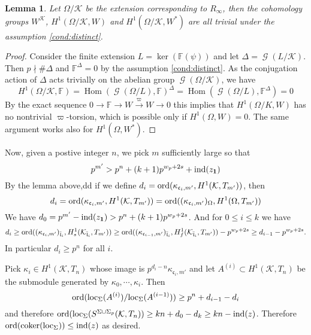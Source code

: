 \documentclass[leqno]{amsart}
\newtheorem{lem}[thm]{Lemma}
\theoremstyle{definition}
\theoremstyle{remark}
\newcommand{\id}{\mathbf{1}}
\newcommand{\fF}{\mathbb{F}} %
\DeclareMathOperator{\Hom}{Hom}
\DeclareMathOperator{\coker}{coker}
\DeclareMathOperator{\Gal}{\mathcal{G}}
\newcommand{\fc}{\mathfrak{c}}
\newcommand{\fl}{\mathfrak{l}}
\newcommand{\K}{{\mathcal{K}}} %
\newcommand{\flw}{\bar{\fl}}
\newcommand{\ord}{\textnormal{ord}} %
\begin{document}
\begin{lem}
	Let $\Omega/\K$ be the extension corresponding
	to $R_{\infty}$, then the cohomology groups
	$W^\K$, $H^1(\Omega/\K, W)$ and $H^1(\Omega/\K, W^*)$ 
	are all trivial under the assumption \eqref{cond:distinct}.
\end{lem}
\begin{proof}
	Consider the finite extension $L=\ker(\fF(\psi))$
	and let $\Delta=\Gal(L/\K)$.
	Then  $p\nmid \#\Delta$ 
	and $\fF^\Delta=0$ by the assumption  \ref{cond:distinct}.
	As the conjugation action of $\Delta$ acts trivially
	on the abelian group $\Gal(\Omega/\K)$, we have
	\[
		H^1(\Omega/\K,\fF)=
		\Hom(\Gal(\Omega/L),\fF)^\Delta=
		\Hom(\Gal(\Omega/L),\fF^\Delta)=0
	\]
	By the exact sequence
	$0\to\fF\to W\xrightarrow{\varpi}W\to 0$
	this implies that $H^1(\Omega/K,W)$
	has no nontrivial $\varpi$-torsion, 
	which is possible only if  $H^1(\Omega,W)=0$.
	The same argument works also for $H^1(\Omega,W^*)$.
\end{proof}

Now, given a postive integer $n$,
we pick  $m$ sufficiently large so that
\[
p^{m'}> p^n+(k+1)p^{w_p+2s}+\textnormal{ind}(z_{\id})
\]
By the lemma above,dd
if we define $d_i=\ord(\kappa_{\fc_{i},m'}, H^1(\K,T_{m'}))$, then
\[
	d_i=\ord(\kappa_{\fc_{i},m'}, H^1(\K,T_{m'}))=
	\ord( (\kappa_{\fc_{i},m'})_\Omega, H^1(\Omega,T_{m'}))
\]
We have $d_0=p^{m'}-\textnormal{ind}(z_{\id})>p^n+(k+1)p^{w_p+2s}$.
And for $0\leq i\leq k$ we have
\[
	d_i\geq 
	\ord( (\kappa_{\fc_i,m'})_{\flw_i}, H^1_s(\K_{\flw_i}, T_{m'}))\geq
	\ord( (\kappa_{\fc_{i-1},m'})_{\flw_i}, H^1_f(\K_{\flw_i}, T_{m'}))-p^{w_p+2s}\geq 
	d_{i-1}-p^{w_p+2s}.
\]
In particular $d_i\geq p^n$ for all  $i$.

Pick  $\kappa_i\in H^1(\K, T_{n})$ whose image 
is $p^{d_i-n}\kappa_{\fc_i,m'}$
and let $A^{(i)}\subset H^1(\K,T_{n})$
be the submodule generated by $\kappa_0,\cdots,\kappa_i$.
Then 
\[
	\ord(\textnormal{loc}_\Sigma(A^{(i)})/\textnormal{loc}_\Sigma(A^{(i-1)}))
	\geq p^n+d_{i-1}-d_{i}
\]
and therefore
$\ord(\textnormal{loc}_\Sigma(S^{\Sigma\cup \Sigma_p}(\K, T_{n})) 
\geq kn+d_0-d_{k}\geq kn-\textnormal{ind}(z)$.
Therefore $\ord(\coker(\textnormal{loc}_\Sigma))\leq \textnormal{ind}(z)$
as desired.




\end{document}
